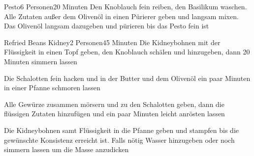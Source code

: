 
\begin{recipe}{Pesto}{6 Personen}{20 Minuten}
Den Knoblauch fein reiben, den Basilikum waschen. Alle Zutaten außer dem Olivenöl in einen Pürierer geben und langsam mixen. Das Olivenöl langsam dazugeben und pürieren bis das Pesto fein ist
\end{recipe} 


\begin{recipe}{Refried Beans Kidney}{2 Personen}{45 Minuten}
Die Kidneybohnen mit der Flüssigkeit in einen Topf geben, den Knoblauch schälen und hinzugeben, dann 20 Minuten simmern lassen

Die Schalotten fein hacken und in der Butter und dem Olivenöl ein paar Minuten in einer Pfanne schmoren lassen

Alle Gewürze zusammen mörsern und zu den Schalotten geben, dann die flüssigen Zutaten hinzufügen und ein paar Minuten leicht anrösten lassen

\ing[]{}{}
Die Kidneybohnen samt Flüssigkeit in die Pfanne geben und stampfen bis die gewünschte Konsistenz erreicht ist. Falls nötig Wasser hinzugeben oder noch simmern lassen um die Masse anzudicken
\end{recipe}


